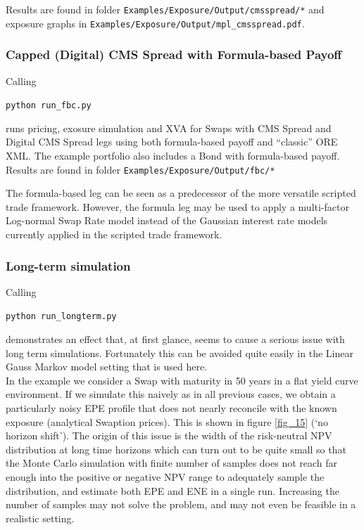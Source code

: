 Results are found in folder {\tt Examples/Exposure/Output/cmsspread/*} and exposure graphs in {\tt Examples/Exposure/Output/mpl\_cmsspread.pdf}.

\subsubsection{Capped (Digital) CMS Spread with Formula-based Payoff}\label{example:exposure_fbc}

Calling

\medskip
\centerline{\tt python run\_fbc.py } 
\medskip

runs pricing, exosure simulation and XVA for Swaps with CMS Spread and
Digital CMS Spread legs using both formula-based payoff and ``classic'' ORE XML.
The example portfolio also includes a Bond with formula-based payoff.
Results are found in folder {\tt Examples/Exposure/Output/fbc/*}

The formula-based leg can be seen as a predecessor of the more versatile
scripted trade framework. However, the formula leg may be used to
apply a multi-factor Log-normal Swap Rate model instead of the Gaussian
interest rate models currently applied in the scripted trade framework.

\subsubsection{Long-term simulation}\label{example:exposure_longterm}

Calling

\medskip
\centerline{\tt python run\_longterm.py } 
\medskip

demonstrates an effect that, at first glance, seems to cause a serious issue with long term simulations.
Fortunately this can be avoided quite easily in the Linear Gauss Markov model setting
that is used here. \\

In the example we consider a Swap with maturity in 50 years in a flat yield curve environment. If we simulate this
naively as in all previous cases, we obtain a particularly noisy EPE profile that does not nearly reconcile with the
known exposure (analytical Swaption prices). This is shown in figure \ref{fig_15} (`no horizon shift'). The origin of
this issue is the width of the risk-neutral NPV distribution at long time horizons which can turn out to be quite small
so that the Monte Carlo simulation with finite number of samples does not reach far enough into the positive or negative
NPV range to adequately sample the distribution, and estimate both EPE and ENE in a single run.  Increasing the number
of samples may not solve the problem, and may not even be feasible in a realistic setting. \\

